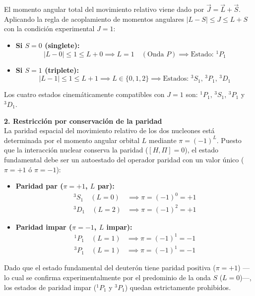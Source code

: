 \begin{problema}
El momento angular total del movimiento relativo viene dado por $\vec{J} = \vec{L} + \vec{S}$. Aplicando la regla de acoplamiento de momentos angulares $|L - S| \le J \le L + S$ con la condición experimental $J = 1$:

\begin{itemize}
    \item \textbf{Si $S = 0$ (singlete):}
    \begin{equation}
    |L - 0| \le 1 \le L + 0 \implies L = 1 \quad (\text{Onda } P) \implies \text{Estado: } {}^{1}P_1
    \end{equation}

    \item \textbf{Si $S = 1$ (triplete):}
    \begin{equation}
    |L - 1| \le 1 \le L + 1 \implies L \in \{0, 1, 2\} \implies \text{Estados: } {}^3S_1, \, {}^3P_1, \, {}^3D_1
    \end{equation}
\end{itemize}

Los cuatro estados cinemáticamente compatibles con $J = 1$ son: ${}^1P_1$, ${}^3S_1$, ${}^3P_1$ y ${}^3D_1$.

\textbf{2. Restricción por conservación de la paridad}\\
La paridad espacial del movimiento relativo de los dos nucleones está determinada por el momento angular orbital $L$ mediante $\pi = (-1)^L$. Puesto que la interacción nuclear conserva la paridad ($[H, \Pi] = 0$), el estado fundamental debe ser un autoestado del operador paridad con un valor único ($\pi = +1$ ó $\pi = -1$):

\begin{itemize}
    \item \textbf{Paridad par ($\pi = +1$, $L$ par):}
    \begin{align}
    {}^3S_1 \quad (L = 0) &\implies \pi = (-1)^0 = +1 \\
    {}^3D_1 \quad (L = 2) &\implies \pi = (-1)^2 = +1
    \end{align}

    \item \textbf{Paridad impar ($\pi = -1$, $L$ impar):}
    \begin{align}
    {}^1P_1 \quad (L = 1) &\implies \pi = (-1)^1 = -1 \\
    {}^3P_1 \quad (L = 1) &\implies \pi = (-1)^1 = -1
    \end{align}
\end{itemize}

Dado que el estado fundamental del deuterón tiene paridad positiva ($\pi = +1$) —lo cual se confirma experimentalmente por el predominio de la onda $S$ ($L = 0$)—, los estados de paridad impar (${}^1P_1$ y ${}^3P_1$) quedan estrictamente prohibidos.


\end{problema}

